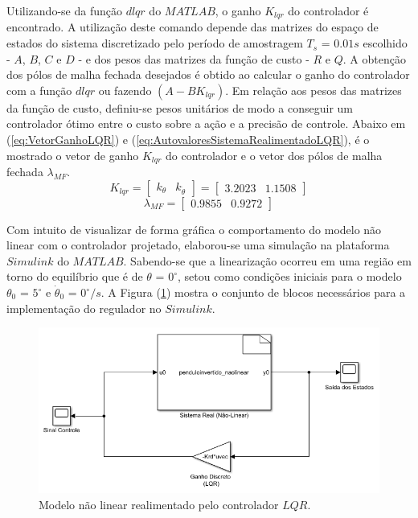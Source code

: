 Utilizando-se da função $dlqr$ do $MATLAB$, o ganho $K_{lqr}$ do controlador é encontrado. A utilização deste comando depende das matrizes do espaço de estados do sistema discretizado pelo período de amostragem $T_s$ = $0.01 s$ escolhido - $A$, $B$, $C$ e $D$ - e dos pesos das matrizes da função de custo - $R$ e $Q$. A obtenção dos pólos de malha fechada desejados é obtido ao calcular o ganho do controlador com a função $dlqr$ ou fazendo $(A-BK_{lqr})$. Em relação aos pesos das matrizes da função de custo, definiu-se pesos unitários de modo a conseguir um controlador ótimo entre o custo sobre a ação e a precisão de controle. Abaixo em (\ref{eq:VetorGanhoLQR}) e (\ref{eq:AutovaloresSistemaRealimentadoLQR}), é o mostrado o vetor de ganho $K_{lqr}$ do controlador e o vetor dos pólos de malha fechada $\lambda_{MF}$.
\begin{equation}\label{eq:VetorGanhoLQR}
K_{lqr} = 
        \begin{bmatrix}
            k_{\theta} & k_{\dot{\theta}}
        \end{bmatrix} =
        \begin{bmatrix}
            3.2023 & 1.1508
        \end{bmatrix}
\end{equation}\label{eq:AutovaloresSistemaRealimentadoLQR}
\begin{equation}
\lambda_{MF} = \begin{bmatrix}
        0.9855 & 0.9272
    \end{bmatrix}
\end{equation}

Com intuito de visualizar de forma gráfica o comportamento do modelo não linear com o controlador projetado, elaborou-se uma simulação na plataforma $Simulink$ do $MATLAB$. Sabendo-se que a linearização ocorreu em uma região em torno do equilíbrio que é de $\theta$ = $0^\circ$, setou como condições iniciais para o modelo $\theta_0$ = $5^\circ$ e $\dot{\theta}_0$ = $0^\circ/s$. A Figura (\ref{fig:Implementacao-LQR}) mostra o conjunto de blocos necessários para a implementação do regulador no $Simulink$. 
\begin{figure}[H]
    \centering
    \includegraphics[scale=0.7]{ProjControladores/lqr_control.png}
    \caption{Modelo não linear realimentado pelo controlador $LQR$.}
    \label{fig:Implementacao-LQR}
\end{figure}{}

